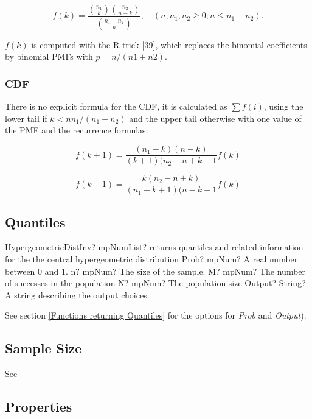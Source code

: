 \begin{equation} 
	f(k) = \frac{\binom{n_1}{k} \binom{n_2}{n-k}}{\binom{n_1+n_2}{n}}, \quad (n,n_1,n_2 \geq 0; n \leq n_1+n_2).
\end{equation}

$f(k)$ is computed with the R trick [39], which replaces the binomial coefficients by
binomial PMFs with $p = n/(n1 + n2)$.


\subsubsection{CDF}
There is no explicit formula for the CDF, it is calculated as $\sum f(i)$, using the lower tail if $k < nn_1/(n_1 + n_2)$ and the upper tail otherwise with one value of the PMF and the recurrence formulas:

\begin{equation} 
	f(k+1)= \frac{(n_1 - k)(n-k)}{(k+1)(n_2 - n+k+1} f(k)
\end{equation}

\begin{equation} 
	f(k-1)= \frac{k(n_2 - n + k)}{(n_1 - k+1)(n-k+1} f(k)
\end{equation}

\subsection{Quantiles}


\begin{mpFunctionsExtract}
	\mpFunctionFive
	{HypergeometricDistInv? mpNumList? returns quantiles and related information for the the central hypergeometric distribution}
	{Prob? mpNum? A real number between 0 and 1.}
	{n? mpNum? The size of the sample.}
	{M? mpNum? The number of successes in the population}
	{N? mpNum? The population size}
	{Output? String? A string describing the output choices}
\end{mpFunctionsExtract}

\vspace{0.3cm}
See section \ref{Functions returning Quantiles} for the options for  {\itshape\sffamily Prob} and {\itshape\sffamily Output}). 

\subsection{Sample Size}

See \cite{guenther_sample_1974}

\subsection{Properties}
\label{HypergeometricDistributionProperties}


